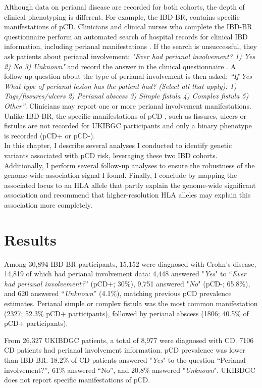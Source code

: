 Although data on perianal disease are recorded for both cohorts, the depth of clinical phenotyping is different. For example, the IBD-BR, contains specific manifestations of pCD. Clinicians and clinical nurses who complete the IBD-BR questionnaire perform an automated search of hospital records for clinical IBD information, including perianal manifestations \cite{ibdbr-protocol-v8}.  If the search is unsuccessful, they ask patients about perianal involvement: \textit{"Ever had perianal involvement? 1) Yes 2) No 3) Unknown"}  and record the answer in the clinical questionnaire \cite{ibdbr-questionnaire-v7}. A follow-up question about the type of perianal involvement is then asked: \textit{“If Yes - What type of perianal lesion has the patient had? (Select all that apply): 1) Tags/fissures/ulcers 2) Perianal abscess 3) Simple fistula 4) Complex fistula 5) Other”}. Clinicians may report one or more perianal involvement manifestations.  Unlike IBD-BR, the specific manifestations of pCD , such as fissures, ulcers or fistulas are not recorded for UKIBGC participants and only a binary phenotype is recorded (pCD+ or pCD-). \\

In this chapter, I describe several analyses I conducted to identify genetic variants associated with pCD risk, leveraging these two IBD cohorts. Additionally, I perform several follow-up analyses to ensure the robustness of the genome-wide association signal I found. Finally, I conclude by mapping the associated locus to an HLA allele that partly explain the genome-wide significant association and recommend that higher-resolution HLA alleles may explain this association more completely.

\section{Results}
Among 30,894 IBD-BR participants, 15,152 were diagnosed with Crohn's disease, 14,819 of which had perianal involvement data: 4,448 answered "\textit{Yes}" to “\textit{Ever had perianal involvement?}” (pCD+; 30\%), 9,751 answered "\textit{No}" (pCD-; 65.8\%), and 620 answered “\textit{Unknown}” (4.1\%), matching previous pCD prevalence estimates. Perianal simple or complex fistula was the most common manifestation (2327;  52.3\% pCD+ participants), followed by perianal abscess (1806; 40.5\% of pCD+ participants).

From 26,327 UKIBDGC patients, a total of 8,977 were diagnosed with CD. 7106 CD patients had perianal involvement information. pCD prevalence was lower than IBD-BR. 18.2\% of CD patients answered "\textit{Yes}" to the question “Perianal involvement?”, 61\% answered “No”, and 20.8\% answered "\textit{Unknown}". UKIBDGC does not report specific manifestations of pCD.

